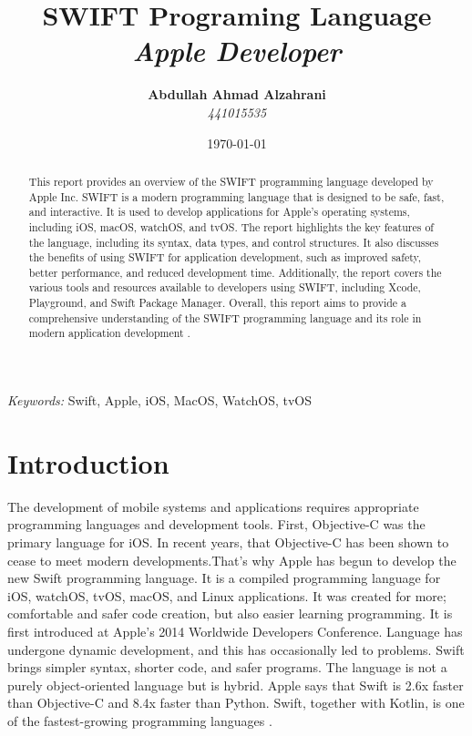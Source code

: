 \documentclass[11pt]{Abdullahmad} %
\title{\textbf{SWIFT  Programing Language} \\ {\Large\itshape Apple Developer }} %
\author{\textbf{Abdullah Ahmad Alzahrani} \\ \textit{441015535}} %
\date{\today} %
\begin{document}
\maketitle %



\begin{abstract}
This report provides an overview of the SWIFT programming language developed by Apple Inc. SWIFT is a modern programming language that is designed to be safe, fast, and interactive. It is used to develop applications for Apple's operating systems, including iOS, macOS, watchOS, and tvOS. The report highlights the key features of the language, including its syntax, data types, and control structures. It also discusses the benefits of using SWIFT for application development, such as improved safety, better performance, and reduced development time. Additionally, the report covers the various tools and resources available to developers using SWIFT, including Xcode, Playground, and Swift Package Manager. Overall, this report aims to provide a comprehensive understanding of the SWIFT programming language and its role in modern application development \cite{Goodwill2015}.
\end{abstract}

\hspace*{3.6mm}\textit{Keywords:} Swift, Apple, iOS, MacOS, WatchOS, tvOS %

\vspace{30pt} %

\newpage
\section*{Introduction}

The development of mobile systems and applications requires appropriate programming languages and development tools. First, Objective-C was the primary language for iOS. In recent years, that Objective-C has been shown to cease
to meet modern developments\cite{7476687}.That's why Apple has begun to develop the new Swift programming language. It is a compiled programming language for iOS, watchOS, tvOS, macOS, and Linux applications. It was created for more; comfortable and safer code creation, but also easier learning programming. It is first introduced at Apple’s 2014 Worldwide Developers Conference. Language has undergone dynamic development, and this has occasionally led to problems. Swift brings simpler syntax, shorter code, and safer programs. The language is not a purely object-oriented language but is hybrid. Apple says that Swift is 2.6x faster than Objective-C and 8.4x faster than Python. Swift, together with Kotlin, is one of the fastest-growing programming languages \cite{doi:10.1137/1.9781611972764.5}.
\end{document}
